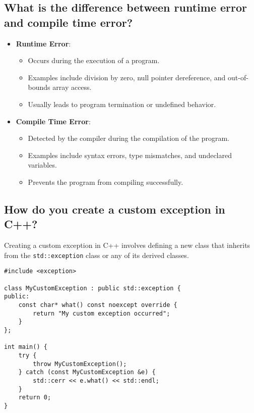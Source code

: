 \subsection{What is the difference between runtime error and compile time error?}
\begin{itemize}
    \item \textbf{Runtime Error}:
    \begin{itemize}
        \item Occurs during the execution of a program.
        \item Examples include division by zero, null pointer dereference, and out-of-bounds array access.
        \item Usually leads to program termination or undefined behavior.
    \end{itemize}

    \item \textbf{Compile Time Error}:
    \begin{itemize}
        \item Detected by the compiler during the compilation of the program.
        \item Examples include syntax errors, type mismatches, and undeclared variables.
        \item Prevents the program from compiling successfully.
    \end{itemize}
\end{itemize}

\subsection{How do you create a custom exception in C++?}
Creating a custom exception in C++ involves defining a new class that inherits from the \texttt{std::exception} class or any of its derived classes.
\begin{tcolorbox}[title=Custom Exception]
\begin{verbatim}
#include <exception>

class MyCustomException : public std::exception {
public:
    const char* what() const noexcept override {
        return "My custom exception occurred";
    }
};

int main() {
    try {
        throw MyCustomException();
    } catch (const MyCustomException &e) {
        std::cerr << e.what() << std::endl;
    }
    return 0;
}
\end{verbatim}
\end{tcolorbox}

